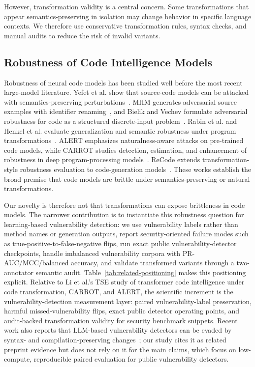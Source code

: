 \documentclass[a4paper,fleqn]{cas-dc}
\begin{document}
However, transformation validity is a central concern. Some transformations
that appear semantics-preserving in isolation may change behavior in specific
language contexts. We therefore use conservative transformation rules, syntax
checks, and manual audits to reduce the risk of invalid variants.

\subsection{Robustness of Code Intelligence Models}

Robustness of neural code models has been studied well before the most recent
large-model literature. Yefet et al. show that source-code models can be
attacked with semantics-preserving perturbations~\cite{yefet2020adversarial}.
MHM generates adversarial source examples with identifier
renaming~\cite{zhang2020mhm}, and Bielik and Vechev formulate adversarial
robustness for code as a structured discrete-input problem~\cite{bielik2020adversarial}.
Rabin et al. and Henkel et al. evaluate generalization and semantic robustness
under program transformations~\cite{rabin2021generalizability,henkel2022semantic}.
ALERT emphasizes naturalness-aware attacks on pre-trained code models, while
CARROT studies detection, estimation, and enhancement of robustness in deep
program-processing models~\cite{yang2022alert,zhang2022carrot}. ReCode
extends transformation-style robustness evaluation to code-generation
models~\cite{wang2023recode}. These works establish the broad premise that
code models are brittle under semantics-preserving or natural transformations.

Our novelty is therefore not that transformations can expose brittleness in
code models. The narrower contribution is to instantiate this robustness
question for learning-based vulnerability detection: we use vulnerability
labels rather than method names or generation outputs, report security-oriented
failure modes such as true-positive-to-false-negative flips, run exact public
vulnerability-detector checkpoints, handle imbalanced vulnerability corpora
with PR-AUC/MCC/balanced accuracy, and validate transformed variants through a
two-annotator semantic audit. Table~\ref{tab:related-positioning} makes this
positioning explicit. Relative to Li et al.'s TSE study of transformer code
intelligence under code transformation, CARROT, and ALERT, the scientific
increment is the vulnerability-detection measurement layer: paired
vulnerability-label preservation, harmful missed-vulnerability flips, exact
public detector operating points, and audit-backed transformation validity for
security benchmark snippets. Recent work also reports that LLM-based
vulnerability detectors can be evaded by syntax- and compilation-preserving
changes~\cite{sun2026syntax}; our study cites it as related preprint evidence
but does not rely on it for the main claims, which focus on low-compute,
reproducible paired evaluation for public vulnerability detectors.
\end{document}
